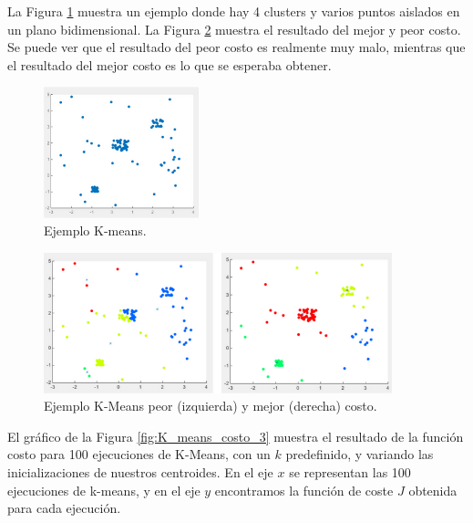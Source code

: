 \documentclass[12pt,a4paper]{article}
\begin{document}
\begin{sloppypar}
La Figura \ref{fig:K_means_costo_1} muestra un ejemplo donde hay 4 clusters y varios puntos aislados en un plano bidimensional. La Figura \ref{fig:K_means_costo_2} muestra el resultado del mejor y peor costo. Se puede ver que el resultado del peor costo es realmente muy malo, mientras que el resultado del mejor costo es lo que se esperaba obtener.  

\begin{figure}[H]    %
 \centering
 \includegraphics[width=0.4\textwidth]{images/K_means_costo_1.png}
 \captionsetup{justification=centering,margin=2cm}
 \caption{Ejemplo K-means. \cite{apunte_uba}}
 \label{fig:K_means_costo_1}
\end{figure}

\begin{figure}[H]    %
 \centering
 \includegraphics[width=0.9\textwidth]{images/K_means_costo_2.png}
 \captionsetup{justification=centering,margin=1cm}
 \caption{Ejemplo K-Means peor (izquierda) y mejor (derecha) costo. \cite{apunte_uba}}
 \label{fig:K_means_costo_2}
\end{figure}  

El gráfico de la Figura \ref{fig:K_means_costo_3} muestra el resultado de la función costo para 100 ejecuciones de K-Means, con un $k$ predefinido, y variando las inicializaciones de nuestros centroides. En el eje $x$ se representan las 100 ejecuciones de k-means, y en el eje $y$ encontramos la función de coste $J$ obtenida para cada ejecución. 


\end{sloppypar}
\end{document}
